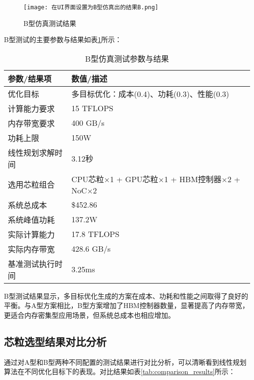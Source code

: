 \documentclass[bachelor]{thesis-uestc}
\begin{document}
\begin{figure}[htbp]
    \centering
    \texttt{[image: 在UI界面设置为B型仿真出的结果B.png]}
    \caption{B型仿真测试结果}
    \label{fig:result_b}
\end{figure}

B型测试的主要参数与结果如表\ref{tab:type_b_results}所示：

\begin{table}[htbp]
\caption{B型仿真测试参数与结果}
\centering
\begin{tabular}{|l|p{10cm}|}
\hline
\textbf{参数/结果项} & \textbf{数值/描述} \\
\hline
优化目标 & 多目标优化：成本(0.4)、功耗(0.3)、性能(0.3) \\
\hline
计算能力要求 & 15 TFLOPS \\
\hline
内存带宽要求 & 400 GB/s \\
\hline
功耗上限 & 150W \\
\hline
线性规划求解时间 & 3.12秒 \\
\hline
选用芯粒组合 & CPU芯粒×1 + GPU芯粒×1 + HBM控制器×2 + NoC×2 \\
\hline
系统总成本 & \$452.86 \\
\hline
系统峰值功耗 & 137.2W \\
\hline
实际计算能力 & 17.8 TFLOPS \\
\hline
实际内存带宽 & 428.6 GB/s \\
\hline
基准测试执行时间 & 3.25ms \\
\hline
\end{tabular}
\label{tab:type_b_results}
\end{table}

B型测试结果显示，多目标优化生成的方案在成本、功耗和性能之间取得了良好的平衡。与A型方案相比，B型方案增加了HBM控制器数量，显著提高了内存带宽，更适合内存密集型应用场景，但系统总成本也相应增加。

\subsection{芯粒选型结果对比分析}

通过对A型和B型两种不同配置的测试结果进行对比分析，可以清晰看到线性规划算法在不同优化目标下的表现。对比结果如表\ref{tab:comparison_results}所示：
\end{document}
